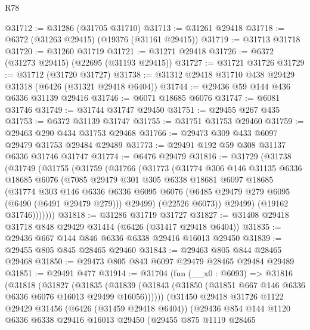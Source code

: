 \begin{lexlean}{R78}
\begin{coremodule}
@31712 := @31286 (@31705 @31710)
@31713 := @31261 @29418
@31718 := @6372 (@31263 @29415) (@19376 (@31161 @29415))
@31719 := @31713 @31718
@31720 := @31260 @31719
@31721 := @31271 @29418
@31726 := @6372 (@31273 @29415) (@22695 (@31193 @29415))
@31727 := @31721 @31726
@31729 := @31712 (@31720 @31727)
@31738 := @31312 @29418 @31710 @438 @29429 @31318 (@6426 (@31321 @29418 @6404))
@31744 := @29436 @59 @144 @436 @6336 @31139 @29416
@31746 := @6071 @18685 @6076
@31747 := @6081 @31746
@31749 := @31744 @31747 @29450
@31751 := @29455 @267 @435
@31753 := @6372 @31139 @31747
@31755 := @31751 @31753 @29460
@31759 := @29463 @290 @434 @31753 @29468
@31766 := @29473 @309 @433 @6097 @29479 @31753 @29484 @29489
@31773 := @29491 @192 @59 @308 @31137 @6336 @31746 @31747
@31774 := @6476 @29479
@31816 := @31729
    (@31738
      (@31749
        (@31755
          (@31759
            (@31766
              (@31773
                (@31774
                  @306
                  @146
                  @31135
                  @6336
                  @18685
                  @6076
                  (@7085
                    @29479
                    @301
                    @305
                    @6338
                    @18681
                    @6097
                    @18685
                    (@31774
                      @303
                      @146
                      @6336
                      @6336
                      @6095
                      @6076
                      (@6485 @29479 @279 @6095 (@6490 (@6491 @29479 @279)))
                      @29499)
                    (@22526 @6073))
                  @29499)
                (@19162 @31746)))))))
@31818 := @31286 @31719 @31727
@31827 := @31408 @29418 @31718 @848 @29429 @31414 (@6426 (@31417 @29418 @6404))
@31835 := @29436 @667 @144 @846 @6336 @6338 @29416 @16013 @29450
@31839 := @29455 @805 @845 @28465 @29460
@31843 := @29463 @805 @844 @28465 @29468
@31850 := @29473 @805 @843 @6097 @29479 @28465 @29484 @29489
@31851 := @29491 @477
@31914 := @31704
    (fun (__x0 : @6093) =>
    @31816
      (@31818
        (@31827
          (@31835
            (@31839 (@31843 (@31850 (@31851 @667 @146 @6336 @6336 @6076 @16013 @29499 @16056))))))
        (@31450
          @29418
          @31726
          @1122
          @29429
          @31456
          (@6426 (@31459 @29418 @6404))
          (@29436
            @854
            @144
            @1120
            @6336
            @6338
            @29416
            @16013
            @29450
            (@29455
              @875
              @1119
              @28465

\end{coremodule}
\end{lexlean}
